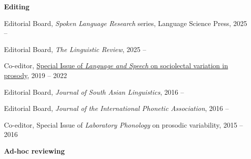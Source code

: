\documentclass[10pt]{article}
\newcommand{\blankline}{\quad\pagebreak[3]}
\begin{document}
\blankline

\textbf{Editing}

\begin{innerlist}

\item Editorial Board, \textit{Spoken Language Research} series, Language Science Press,
  2025 --

\item Editorial Board, \textit{The Linguistic Review},
  2025 --
\item Co-editor, \href{https://journals.sagepub.com/toc/lasa/65/4}{Special Issue of \textit{Language and Speech} on sociolectal variation in prosody}, 2019 -- 2022
\item Editorial Board, \textit{Journal of South Asian Linguistics},
  2016 --
\item Editorial Board, \textit{Journal of the International Phonetic
    Association}, 2016 --
\item Co-editor, Special Issue of \textit{Laboratory
    Phonology} on prosodic variability, 2015 -- 2016
\end{innerlist}

\blankline

\textbf{Ad-hoc reviewing}
\end{document}
